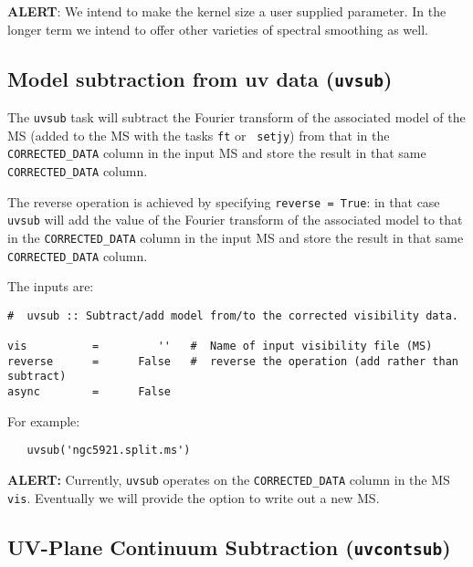 {\bf ALERT}: We intend to make the kernel size a user supplied
parameter.  In the longer term we intend to offer other varieties of
spectral smoothing as well.

\subsection{Model subtraction from uv data ({\tt uvsub})}
\label{section:cal.other.uvsub}

The {\tt uvsub} task will subtract the Fourier transform of the
associated model of the MS (added to the MS with the tasks {\tt ft} or {\tt
  setjy}) from that in the {\tt
  CORRECTED\_DATA} column in the input MS and store the result in that
same {\tt CORRECTED\_DATA} column. 

The reverse operation is achieved by specifying {\tt reverse = True}:
in that case {\tt uvsub} will add the value of the Fourier transform of
the associated model to that in the {\tt CORRECTED\_DATA} column in
the input MS and store the result in that same {\tt CORRECTED\_DATA}
column.

The inputs are:

\small
\begin{verbatim}
#  uvsub :: Subtract/add model from/to the corrected visibility data.

vis          =         ''   #  Name of input visibility file (MS)
reverse      =      False   #  reverse the operation (add rather than subtract)
async        =      False   
\end{verbatim}
\normalsize

For example:
\small
\begin{verbatim}
   uvsub('ngc5921.split.ms')
\end{verbatim}
\normalsize

{\bf ALERT:} Currently, {\tt uvsub} operates on the {\tt CORRECTED\_DATA}
column in the MS {\tt vis}.  Eventually we will provide the option to
write out a new MS.

\subsection{UV-Plane Continuum Subtraction ({\tt uvcontsub})}
\label{section:cal.other.uvcontsub}

